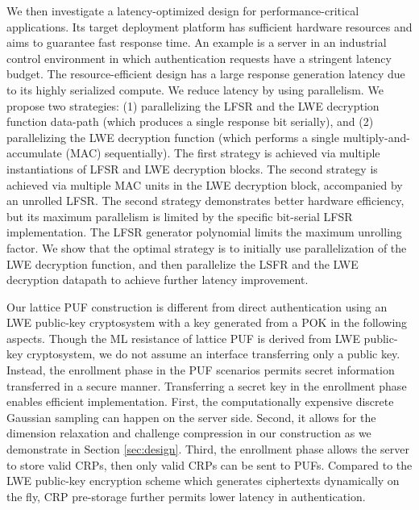 We then investigate a latency-optimized design for performance-critical applications. 
Its target deployment platform has sufficient hardware resources and aims to guarantee fast response time. 
An example is a server in an industrial control environment in which authentication requests have a stringent latency budget. 
The resource-efficient design has a large response generation latency due to its highly serialized compute. 
We reduce latency by using parallelism. 
We propose two strategies: (1) parallelizing the LFSR and the LWE decryption function data-path (which produces a single response bit serially), and (2) parallelizing the LWE decryption function (which performs a single multiply-and-accumulate (MAC) sequentially). 
The first strategy is achieved via multiple instantiations of LFSR and LWE decryption blocks. 
The second strategy is achieved via multiple MAC units in the LWE decryption block, accompanied by an unrolled LFSR. 
The second strategy demonstrates better hardware efficiency, but its maximum parallelism is limited by the specific bit-serial LFSR implementation. 
The LFSR generator polynomial limits the maximum unrolling factor. 
We show that the optimal strategy is to initially use parallelization of the LWE decryption function, and then parallelize the LSFR and the LWE decryption datapath to achieve further latency improvement.

Our lattice PUF construction is different from direct authentication using an LWE public-key cryptosystem with a key generated from a POK in the following aspects. 
Though the ML resistance of lattice PUF is derived from LWE public-key cryptosystem, we do not assume an interface transferring only a public key. 
Instead, the enrollment phase in the PUF scenarios permits secret information transferred in a secure manner. 
Transferring a secret key in the enrollment phase enables efficient implementation. 
First, the computationally expensive discrete Gaussian sampling can happen on the server side. 
Second, it allows for the dimension relaxation and challenge compression in our construction as we demonstrate in Section \ref{sec:design}.
Third, the enrollment phase allows the server to store valid CRPs, then only valid CRPs can be sent to PUFs. 
Compared to the LWE public-key encryption scheme which generates ciphertexts dynamically on the fly, CRP pre-storage further permits lower latency in authentication.

